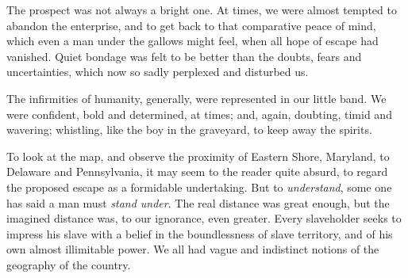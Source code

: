 The prospect was not always a bright one. At times, we were almost
tempted to abandon the enterprise, and to get back to that comparative
peace of {\protect\hypertarget{281}{}{}}mind, which even a man under the
gallows might feel, when all hope of escape had vanished. Quiet bondage
was felt to be better than the doubts, fears and uncertainties, which
now so sadly perplexed and disturbed us.

The infirmities of humanity, generally, were represented in our little
band. We were confident, bold and determined, at times; and, again,
doubting, timid and wavering; whistling, like the boy in the graveyard,
to keep away the spirits.

To look at the map, and observe the proximity of Eastern Shore,
Maryland, to Delaware and Pennsylvania, it may seem to the reader quite
absurd, to regard the proposed escape as a formidable undertaking. But
to \emph{understand}, some one has said a man must \emph{stand under}.
The real distance was great enough, but the imagined distance was, to
our ignorance, even greater. Every slaveholder seeks to impress his
slave with a belief in the boundlessness of slave territory, and of his
own almost illimitable power. We all had vague and indistinct notions of
the geography of the country.

